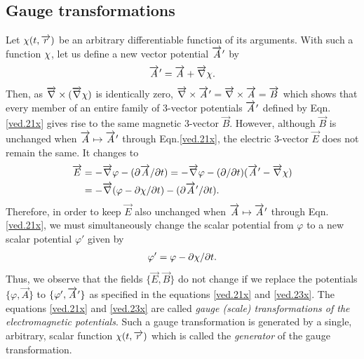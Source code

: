 \subsection{Gauge transformations}
Let ${\chi}(t, \overrightarrow{r}) $ be an arbitrary differentiable 
function of its  arguments. With such a function ${\chi}$, 
let us define a new vector potential ${\overrightarrow{A}\hspace*{.3pt}'}$ by
\begin{align}\label{ved.21x}
{\ensuremath{\overrightarrow{A}\hspace*{.3pt}'}} =\overrightarrow{A}+ {\overrightarrow{\nabla} } {\chi} .
\end{align}
Then, as ${\overrightarrow{\nabla} } \times({\overrightarrow{\nabla} } {\chi} ) $ is identically zero, 
${\overrightarrow{\nabla} }\times{\ensuremath{\overrightarrow{A}\hspace*{.3pt}'}}={\overrightarrow{\nabla} }\times\overrightarrow{A}=\overrightarrow{B}$ which shows 
that every member of an entire family of 3-vector potentials 
${\overrightarrow{A}\hspace*{.3pt}'}$ defined by Eqn.\eqref{ved.21x} gives rise to the 
same magnetic 3-vector $\vec{B}$. However, although 
$\vec{B}$ is unchanged when $\overrightarrow{A}\mapsto {\ensuremath{\overrightarrow{A}\hspace*{.3pt}'}} $ 
through Eqn.\eqref{ved.21x}, the electric 3-vector $\vec{E}$ 
does not remain the same. It changes to
\begin{align}\label{ved.22x}
\overrightarrow{E} &= -{\overrightarrow{\nabla} } \varphi-({\partial} \overrightarrow{A}/{\partial} t)=-{\overrightarrow{\nabla} } 
\varphi -({\partial} /{\partial} t) ({\overrightarrow{A}\hspace*{.3pt}'}-{\overrightarrow{\nabla} } {\chi} ) \notag 
\\&=-{\overrightarrow{\nabla} } (\varphi-{\partial} {\chi} /{\partial} t) - ({\partial} 
{\overrightarrow{A}\hspace*{.3pt}'}/{\partial} t).
\end{align}
Therefore, in order to keep $\vec{E}$ also unchanged when  
$\overrightarrow{A}\mapsto {\ensuremath{\overrightarrow{A}\hspace*{.3pt}'}}$ through Eqn.\eqref{ved.21x}, we 
must simultaneously  change the scalar  potential from 
$\varphi $ to a new scalar  potential $\varphi'$ given by
\begin{align}\label{ved.23x}
 \varphi'= \varphi-{\partial} {\chi} /{\partial} t.
\end{align}
Thus, we observe that the fields $\{\vec{E},\vec{B}\}$ do 
not change if we replace the potentials $\{\varphi, 
\vec{A}\}$ to $\{\varphi', {\overrightarrow{A}\hspace*{.3pt}'}\}$ as specified in the 
equations \eqref{ved.21x} and \eqref{ved.23x}. The  
equations \eqref{ved.21x} and \eqref{ved.23x} are called  
\textsl{gauge (scale) transformations of the  
electromagnetic potentials}. Such a gauge  transformation is 
generated by a single, arbitrary, scalar function ${\chi} 
(t,\overrightarrow{r})$ which is called the \textsl{generator} of the 
gauge transformation.

